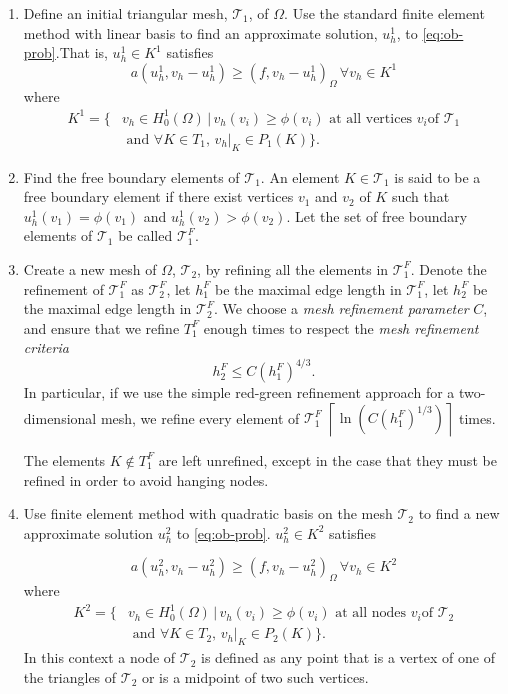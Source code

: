 \documentclass{article}
\newcommand{\T}{\mathcal{T}}
\begin{document}
\begin{enumerate}
\item Define an initial triangular mesh, $\T_1$, of $\Omega$.  Use the
  standard finite element method with linear basis to find an
  approximate solution, $u_h^1$, to \eqref{eq:ob-prob}.That is, $u_h^1
  \in K^1$
  satisfies
  \begin{equation}
    \label{eq:fem-obs}
    a(u_h^1,v_h-u_h^1)\geq (f,v_h-u_h^1)_\Omega\, \forall v_h\in K^1
  \end{equation}
where
\begin{align*}
K^1=
\{&v_h\in H^1_0(\Omega)\,|\,v_h(v_i)\geq \phi(v_i) \text{ at all vertices } v_i \text{
  of } \T_1 \\ &\text{ and } \forall K \in T_1,\, v_h|_{K}\in P_1(K)\}.  
\end{align*}


\item Find the free boundary elements of $\T_1$.  An element $K\in
  \T_1$ is said to be a free boundary element if there exist vertices
  $v_1$ and $v_2$ of $K$ such that $u_h^1(v_1)=\phi(v_1)$ and
  $u_h^1(v_2)>\phi(v_2)$. Let the set of free boundary elements of
  $\T_1$ be called $\T_1^F$. 

\item Create a new mesh of $\Omega$, $\T_2$, by refining all the
  elements in $\T_1^F$.  Denote the refinement of $\T_1^F$ as $\T_2^F$,
  let  $h_1^F$ be the maximal edge length in
  $\T_1^F$, let $h_2^F$ be the maximal edge length in $\T_2^F$.   
We choose a \textit{mesh refinement parameter}
  $C$, and  ensure that we refine $T_1^F$ enough times to respect
  the \textit{mesh refinement criteria}
  \begin{equation}
    \label{eq:mesh-refinement-criteria}
    h_2^F\le C \left(h_1^F\right)^{4/3}.
  \end{equation}
In particular, if we use the simple red-green refinement approach for
a two-dimensional mesh, we refine every element of $\T_1^F$ $\left\lceil
\ln\left(C \left(h_1^F\right)^{1/3}\right)\right\rceil$ times. 

The elements $K \notin T_1^F$ are left unrefined,
  except in the case that they must be refined in order to avoid
  hanging nodes.   

\item Use finite element method with quadratic basis on the mesh $\T_2$ to
  find a new approximate solution $u_h^2$ to \eqref{eq:ob-prob}.
  $u_h^2\in K^2$ satisfies

  \begin{equation}
    \label{eq:fem2-obs}
    a(u_h^2,v_h-u_h^2)\geq (f,v_h-u_h^2)_\Omega\, \forall v_h\in K^2
  \end{equation}
where
\begin{align*}
K^2=
\{&v_h\in H^1_0(\Omega)\,|\,v_h(v_i)\geq \phi(v_i) \text{ at all nodes } v_i \text{
  of } \T_2 \\
&\text{ and } \forall K \in T_2,\, v_h|_{K}\in P_2(K)\}.  
\end{align*}
In this context a node of $\T_2$ is defined as any point that is a
vertex of one of the triangles of $\T_2$ or is a midpoint of two such
vertices.  




\end{enumerate}
\end{document}
